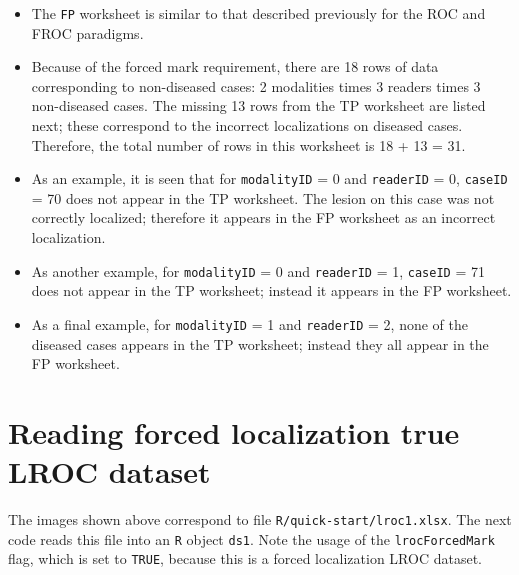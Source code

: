 \documentclass[
]{book}
\providecommand{\tightlist}{%
  \setlength{\itemsep}{0pt}\setlength{\parskip}{0pt}}
\begin{document}
\begin{itemize}
\tightlist
\item
  The \texttt{FP} worksheet is similar to that described previously for the ROC and FROC paradigms.
\item
  Because of the forced mark requirement, there are 18 rows of data corresponding to non-diseased cases: 2 modalities times 3 readers times 3 non-diseased cases. The missing 13 rows from the TP worksheet are listed next; these correspond to the incorrect localizations on diseased cases. Therefore, the total number of rows in this worksheet is 18 + 13 = 31.
\item
  As an example, it is seen that for \texttt{modalityID} = 0 and \texttt{readerID} = 0, \texttt{caseID} = 70 does not appear in the TP worksheet. The lesion on this case was not correctly localized; therefore it appears in the FP worksheet as an incorrect localization.
\item
  As another example, for \texttt{modalityID} = 0 and \texttt{readerID} = 1, \texttt{caseID} = 71 does not appear in the TP worksheet; instead it appears in the FP worksheet.
\item
  As a final example, for \texttt{modalityID} = 1 and \texttt{readerID} = 2, none of the diseased cases appears in the TP worksheet; instead they all appear in the FP worksheet.
\end{itemize}

\hypertarget{quick-start-lroc-data-1}{%
\section{Reading forced localization true LROC dataset}\label{quick-start-lroc-data-1}}

The images shown above correspond to file \texttt{R/quick-start/lroc1.xlsx}. The next code reads this file into an \texttt{R} object \texttt{ds1}. Note the usage of the \texttt{lrocForcedMark} flag, which is set to \texttt{TRUE}, because this is a forced localization LROC dataset.
\end{document}

